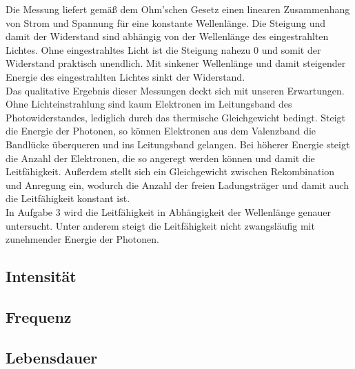 Die Messung liefert gemäß dem Ohm'schen Gesetz einen linearen Zusammenhang von Strom und Spannung für eine konstante Wellenlänge. Die Steigung und damit der Widerstand sind abhängig von der Wellenlänge des eingestrahlten Lichtes. Ohne eingestrahltes Licht ist die Steigung nahezu 0 und somit der Widerstand praktisch unendlich. Mit sinkener Wellenlänge und damit steigender Energie des eingestrahlten Lichtes sinkt der Widerstand. \\
Das qualitative Ergebnis dieser Messungen deckt sich mit unseren Erwartungen. Ohne Lichteinstrahlung sind kaum Elektronen im Leitungsband des Photowiderstandes, lediglich durch das thermische Gleichgewicht bedingt. Steigt die Energie der Photonen, so können Elektronen aus dem Valenzband die Bandlücke überqueren und ins Leitungsband gelangen. Bei höherer Energie steigt die Anzahl der Elektronen, die so angeregt werden können und damit die Leitfähigkeit. Außerdem stellt sich ein Gleichgewicht zwischen Rekombination und Anregung ein, wodurch die Anzahl der freien Ladungsträger und damit auch die Leitfähigkeit konstant ist. \\
In Aufgabe 3 wird die Leitfähigkeit in Abhängigkeit der Wellenlänge genauer untersucht. Unter anderem steigt die Leitfähigkeit nicht zwangsläufig mit zunehmender Energie der Photonen. \\

\subsection{Intensität}

\subsection{Frequenz}

\subsection{Lebensdauer}


